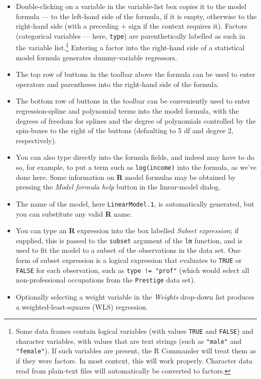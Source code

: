 \documentclass{article}%
\begin{document}
\begin{itemize}
\item Double-clicking on a variable in the variable-list box copies it to the
model formula --- to the left-hand side of the formula, if it is empty,
otherwise to the right-hand side (with a preceding + sign if the context
requires it). Factors (categorical variables --- here, \texttt{type}) are parenthetically
labelled as such in the variable list.\footnote{Some data frames contain
logical variables (with values \texttt{TRUE} and \texttt{FALSE}) and character
variables, with values that are text strings (such as \texttt{"male"} and
\texttt{"female"}). If such variables are present, the R Commander will treat
them as if they were factors. In most context, this will work properly.
Character data read from plain-text files will automatically be converted to
factors.} Entering a factor into the right-hand side of a statistical model
formula generates dummy-variable regressors.

\item The top row of buttons in the toolbar above the formula can be used to
enter operators and parentheses into the right-hand side of the formula.

\item The bottom row of buttons in the toolbar can be conveniently used to
enter regression-spline and polynomial terms into the model formula, with the
degrees of freedom for splines and the degree of polynomials controlled by the
spin-boxes to the right of the buttons (defaulting to 5 df and degree 2, respectively).

\item You can also type directly into the formula fields, and indeed may have
to do so, for example, to put a term such as \texttt{log(income)} into the
formula, as we've done here. Some information on \textbf{R} model formulas may
be obtained by pressing the \emph{Model formula help} button in the
linear-model dialog.

\item The name of the model, here \texttt{LinearModel.1}, is automatically
generated, but you can substitute any valid \textbf{R} name.

\item You can type an \textbf{R} expression into the box labelled \emph{Subset
expression}; if supplied, this is passed to the \texttt{subset} argument of
the \texttt{lm} function, and is used to fit the model to a subset of the
observations in the data set. One form of subset expression is a logical
expression that evaluates to \texttt{TRUE} or \texttt{FALSE} for each
observation, such as \texttt{type != "prof"} (which would select all
non-professional occupations from the \texttt{Prestige} data set).

\item Optionally selecting a weight variable in the \emph{Weights} drop-down
list produces a weighted-least-squares (WLS) regression.
\end{itemize}
\end{document}
